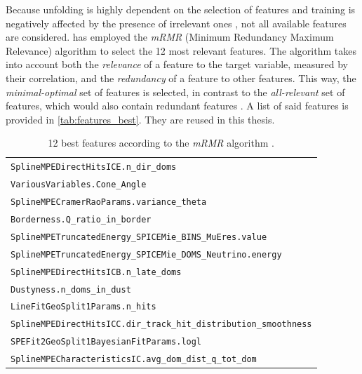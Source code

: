 Because
  unfolding is highly dependent on the selection of features \cite{dsea_jan} %
  and training is negatively affected by the presence of irrelevant ones \cite{dash1997},
not all available features are considered.
%
\citeauthor{dsea_jan} \cite{dsea_jan} has employed the \emph{mRMR} (Minimum Redundancy Maximum Relevance) algorithm \cite{mrmr}
to select the 12 most relevant features.
The algorithm takes into account both
  the \emph{relevance} of a feature to the target variable,
    measured by their correlation,
  and the \emph{redundancy} of a feature to other features.
This way,
the \emph{minimal-optimal} set of features is selected,
  in contrast to the \emph{all-relevant} set of features,
    which would also contain redundant features \citationneeded{}. %
A list of said features is provided in \autoref{tab:features_best}.
They are reused in this thesis.

\begin{table}
  \centering
  \begin{tabular}{l}
    \toprule
    \texttt{SplineMPEDirectHitsICE.n\_dir\_doms} \\
    \texttt{VariousVariables.Cone\_Angle} \\
    \texttt{SplineMPECramerRaoParams.variance\_theta} \\
    \texttt{Borderness.Q\_ratio\_in\_border} \\
    \texttt{SplineMPETruncatedEnergy\_SPICEMie\_BINS\_MuEres.value} \\
    \texttt{SplineMPETruncatedEnergy\_SPICEMie\_DOMS\_Neutrino.energy} \\
    \texttt{SplineMPEDirectHitsICB.n\_late\_doms} \\
    \texttt{Dustyness.n\_doms\_in\_dust} \\
    \texttt{LineFitGeoSplit1Params.n\_hits} \\
    \texttt{SplineMPEDirectHitsICC.dir\_track\_hit\_distribution\_smoothness} \\
    \texttt{SPEFit2GeoSplit1BayesianFitParams.logl} \\
    \texttt{SplineMPECharacteristicsIC.avg\_dom\_dist\_q\_tot\_dom} \\
    \bottomrule
  \end{tabular}
  \caption{
    12 best features according to the \emph{mRMR} algorithm \cite{dsea_jan}.
  }
  \label{tab:features_best}
\end{table}


